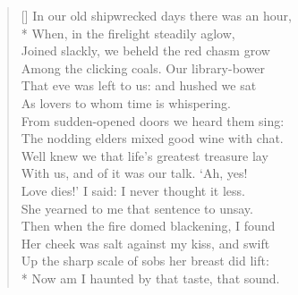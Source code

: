 \documentclass[MAIN]{subfiles}
\begin{document}
\settowidth{\versewidth}{\vin Up the sharp scale of sobs her breast did lift:}
\begin{verse}[\versewidth]
In our old shipwrecked days there was an hour,\\* 
\vin When, in the firelight steadily aglow,\\
\vin Joined slackly, we beheld the red chasm grow\\
Among the clicking coals. Our library-bower\\
That eve was left to us: and hushed we sat\\
\vin As lovers to whom time is whispering.\\
\vin From sudden-opened doors we heard them sing:\\
The nodding elders mixed good wine with chat.\\
Well knew we that life's greatest treasure lay\\
\vin With us, and of it was our talk. `Ah, yes!\\
\vin Love dies!' I said: I never thought it less.\\
She yearned to me that sentence to unsay.\\
Then when the fire domed blackening, I found\\
\vin Her cheek was salt against my kiss, and swift\\
\vin Up the sharp scale of sobs her breast did lift:\\*
Now am I haunted by that taste, that sound.
\end{verse}
\end{document}
